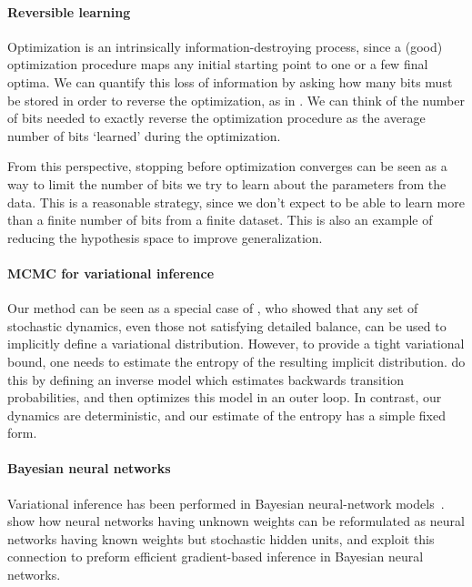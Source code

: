 \documentclass[]{article}
\begin{document}

\paragraph{Reversible learning} 
Optimization is an intrinsically information-destroying process, since a (good) optimization procedure maps any initial starting point to one or a few final optima.
We can quantify this loss of information by asking how many bits must be stored in order to reverse the optimization, as in \citet{MacDuvAda2015hyper}.
We can think of the number of bits needed to exactly reverse the optimization procedure as the average number of bits `learned' during the optimization.

From this perspective, stopping before optimization converges can be seen as a way to limit the number of bits we try to learn about the parameters from the data.
This is a reasonable strategy, since we don't expect to be able to learn more than a finite number of bits from a finite dataset.
This is also an example of reducing the hypothesis space to improve generalization.

\paragraph{MCMC for variational inference}
Our method can be seen as a special case of \citet{Bridging14}, who showed that any set of stochastic dynamics, even those not satisfying detailed balance, can be used to implicitly define a variational distribution.
However, to provide a tight variational bound, one needs to estimate the entropy of the resulting implicit distribution.
\citet{Bridging14} do this by defining an inverse model which estimates backwards transition probabilities, and then optimizes this model in an outer loop.
In contrast, our dynamics are deterministic, and our estimate of the entropy has a simple fixed form.

\paragraph{Bayesian neural networks}
Variational inference has been performed in Bayesian neural-network models~\citep{graves2011practical, deepGPVar14, Miguel2015pbp}.
\citet{kingma2014efficient} show how neural networks having unknown weights can be reformulated as neural networks having known weights but stochastic hidden units, and exploit this connection to preform efficient gradient-based inference in Bayesian neural networks.
\end{document}
